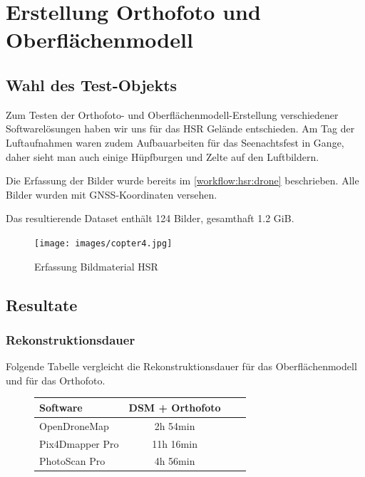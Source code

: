 \chapter{Erstellung Orthofoto und Oberflächenmodell}

\label{ch:eval-aerial}


\section{Wahl des Test-Objekts}

Zum Testen der Orthofoto- und Oberflächenmodell-Erstellung verschiedener
Softwarelösungen haben wir uns für das HSR Gelände entschieden. Am Tag der
Luftaufnahmen waren zudem Aufbauarbeiten für das Seenachtsfest in Gange, daher
sieht man auch einige Hüpfburgen und Zelte auf den Luftbildern.

Die Erfassung der Bilder wurde bereits im \autoref{workflow:hsr:drone}
beschrieben. Alle Bilder wurden mit GNSS-Koordinaten versehen.

Das resultierende Dataset enthält 124 Bilder, gesamthaft 1.2 GiB.

\begin{figure}[H]
	\centering
	\texttt{[image: images/copter4.jpg]}
	\caption{Erfassung Bildmaterial HSR}
	\label{img:copter4}
\end{figure}


\newpage
\section{Resultate}

\subsection{Rekonstruktionsdauer}

Folgende Tabelle vergleicht die Rekonstruktionsdauer für das Oberflächenmodell
und für das Orthofoto.

\begin{figure}[H]
	\begin{tabularx}{\textwidth}[H]{Xccc}
		\toprule
		\textbf{Software} & \textbf{DSM + Orthofoto} \\
		\midrule
		OpenDroneMap & 2h 54min \\
		Pix4Dmapper Pro & 11h 16min \\
		PhotoScan Pro & 4h 56min \\
		\bottomrule
	\end{tabularx}
\end{figure}

